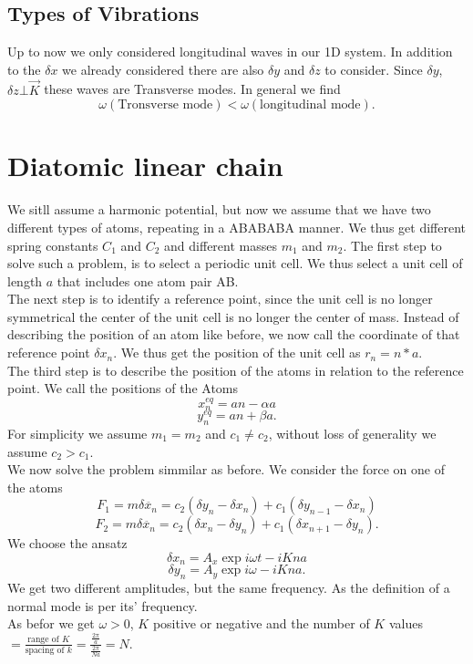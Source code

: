 \documentclass{report}
\begin{document}
\subsection{Types of Vibrations}
Up to now we only considered longitudinal waves in our 1D system. In addition to the $\delta x$ we already considered there are also $\delta y$ and $\delta z$ to consider. Since $\delta y$, $\delta z \bot \vec{K}$ these waves are Transverse modes. In general we find \[
	\omega\left( \text{Tronsverse mode} \right) < \omega\left( \text{longitudinal mode} \right) 
.\] 
\section{Diatomic linear chain}
We sitll assume a harmonic potential, but now we assume that we have two different types of atoms, repeating in a ABABABA manner. We thus get different spring constants $C_1$ and $C_2$ and different masses $m_1$ and $m_2$. 
The first step to solve such a problem, is to select a periodic unit cell.  We thus select a unit cell of length $a$ that includes one atom pair AB.\\
The next step is to identify a reference point, since the unit cell is no longer symmetrical the center of the unit cell is no longer the center of mass. Instead of describing the position of an atom like before, we now call the coordinate of that reference point $\delta x_n$. We thus get the position of the unit cell as $r_n = n*a$.\\
The third step is to describe the position of the atoms in relation to the reference point. We call the positions of the Atoms \[
	x_n^{eq} = an - \alpha a
\]\[
y_n^{eq} = an + \beta a
.\]  For simplicity we assume $m_1=m_2$ and $c_1 \neq c_2$, without loss of generality we assume $c_2 > c_1$.\\
We now solve the problem simmilar as before. We consider the force on one of the atoms \[
	F_1 = m \delta \ddot{x_n} = c_2 \left(\delta y_n - \delta x_n  \right) + c_1 \left( \delta y_{n-1} - \delta x_n \right)  
\] \[
	F_2 = m \delta \ddot{x_n} = c_2 \left(\delta x_n - \delta y_n  \right) + c_1 \left( \delta x_{n+1} - \delta y_n \right)  
.\] We choose the ansatz \[
\delta x_n = A_x \exp{i \omega t - i Kna}
\]\[
\delta y_n = A_y \exp{i \omega - iKna}
.\] We get two different amplitudes, but the same frequency. As the definition of a normal mode is per its' frequency. \\
As befor we get $\omega > 0$, $K$ positive or negative and the number of  $K$ values $= \frac{\text{range of }K}{\text{spacing of }k} = \frac{\frac{2\pi}{a}}{\frac{2\pi}{Na}} = N$.\\
\end{document}
